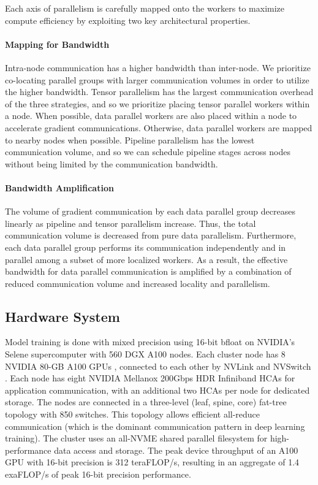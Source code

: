\documentclass[11pt]{article}
\begin{document}
Each axis of parallelism is carefully mapped onto the workers to maximize
compute efficiency by exploiting two key architectural properties.

\paragraph{Mapping for Bandwidth}
Intra-node communication has a higher bandwidth than inter-node.
We prioritize co-locating parallel groups with larger communication volumes
in order to utilize the higher bandwidth.
Tensor parallelism has the largest communication overhead of the three strategies,
and so we prioritize placing tensor parallel workers within a node.
When possible, data parallel workers are also placed
within a node to accelerate gradient communications. Otherwise, data parallel workers
are mapped to nearby nodes when possible.
Pipeline parallelism has the lowest communication volume, and so we can schedule pipeline
stages across nodes without being limited by the communication bandwidth.


\paragraph{Bandwidth Amplification}
The volume of gradient communication by each data parallel group decreases linearly
as pipeline and tensor parallelism increase. Thus, the total communication volume is
decreased from pure data parallelism. Furthermore, each data parallel group
performs its communication independently and in parallel among a subset of more
localized workers. As a result, the effective bandwidth for data parallel
communication is amplified by a combination of reduced communication volume and
increased locality and parallelism.


\subsection{Hardware System}
Model training is done with mixed precision using 16-bit bfloat on NVIDIA’s Selene \cite{selene}
supercomputer with 560 DGX A100 nodes. Each cluster node has 8 NVIDIA 80-GB A100
GPUs \cite{a100}, connected to each other by NVLink and NVSwitch \cite{nvlink}.
Each node has eight NVIDIA Mellanox 200Gbps HDR Infiniband HCAs for application
communication, with an additional two HCAs per node for dedicated storage. The
nodes are connected in a three-level (leaf, spine, core) fat-tree topology with
850 switches. This topology allows efficient all-reduce communication (which is the dominant
communication pattern in deep learning training). The cluster uses an all-NVME
shared parallel filesystem for high-performance data access and storage. The
peak device throughput of an A100 GPU with 16-bit precision is 312 teraFLOP/s,
resulting in an aggregate of 1.4 exaFLOP/s of peak 16-bit precision performance.
\end{document}

